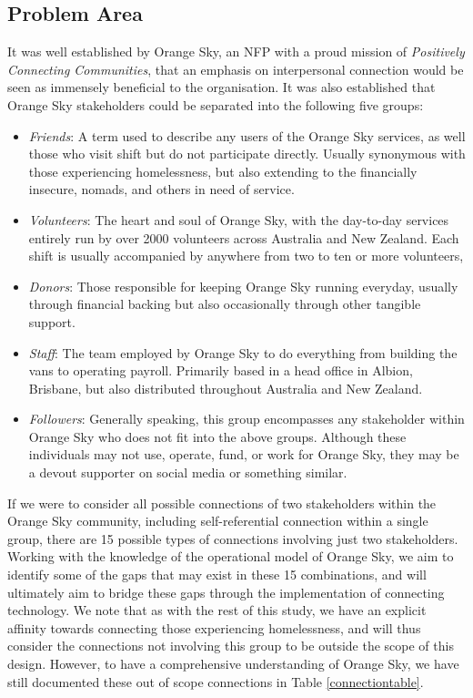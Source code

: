 \subsection{Problem Area}

It was well established by Orange Sky, an NFP with a proud mission of \emph{Positively Connecting Communities}, that an emphasis on interpersonal connection would be seen as immensely beneficial to the organisation. It was also established that Orange Sky stakeholders could be separated into the following five groups:

\begin{itemize}
    \item \emph{Friends}: A term used to describe any users of the Orange Sky services, as well those who visit shift but do not participate directly. Usually synonymous with those experiencing homelessness, but also extending to the financially insecure, nomads, and others in need of service.
    \item \emph{Volunteers}: The heart and soul of Orange Sky, with the day-to-day services entirely run by over 2000 volunteers across Australia and New Zealand. Each shift is usually accompanied by anywhere from two to ten or more volunteers,
    \item \emph{Donors}: Those responsible for keeping Orange Sky running everyday, usually through financial backing but also occasionally through other tangible support.
    \item \emph{Staff}: The team employed by Orange Sky to do everything from building the vans to operating payroll. Primarily based in a head office in Albion, Brisbane, but also distributed throughout Australia and New Zealand.
    \item \emph{Followers}: Generally speaking, this group encompasses any stakeholder within Orange Sky who does not fit into the above groups. Although these individuals may not use, operate, fund, or work for Orange Sky, they may be a devout supporter on social media or something similar.
\end{itemize}

If we were to consider all possible connections of two stakeholders within the Orange Sky community, including self-referential connection within a single group, there are 15 possible types of connections involving just two stakeholders. Working with the knowledge of the operational model of Orange Sky, we aim to identify some of the gaps that may exist in these 15 combinations, and will ultimately aim to bridge these gaps through the implementation of connecting technology. We note that as with the rest of this study, we have an explicit affinity towards connecting those experiencing homelessness, and will thus consider the connections not involving this group to be outside the scope of this design. However, to have a comprehensive understanding of Orange Sky, we have still documented these out of scope connections in Table \ref{connectiontable}.

